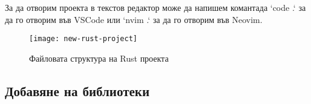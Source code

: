 За да отворим проекта в текстов редактор може да напишем комантада `code .` за
да го отворим във VSCode или `nvim .` за да го отворим във Neovim.
 
\begin{figure}[!htb]
  \texttt{[image: new-rust-project]}
  \centering
  \caption{Файловата структура на Rust проекта}
  \label{fig:new-rust-project}
\end{figure}

\subsection{Добавяне на библиотеки}


